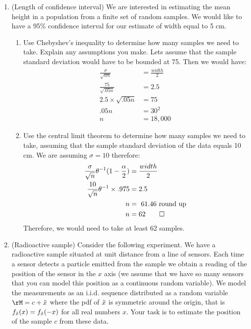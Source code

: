 \documentclass[12pt,twoside]{article}
\newcommand{\rnd}{\Tilde  }
\newcommand{\rx}{\rnd{ x}  }
\begin{document}
\begin{enumerate}
\item (Length of confidence interval) 
We are interested in estimating the mean height in a population from a finite set of random samples. We would like to have a 95\% confidence interval for our estimate of width equal to 5 cm.
\begin{enumerate}
\item Use Chebyshev's inequality to determine how many samples we need to take. Explain any assumptions you make.
\subitem 
Lets assume that the sample standard deviation would have to be bounded at 75.
Then we would have: 
\begin{equation}
    \begin{split}
        \frac{\sigma}{\sqrt{\alpha n}} &= \frac{width}{2} \\
        \frac{75}{\sqrt{.05n}} &= 2.5 \\
        2.5 \times \sqrt{.05n} &= 75 \\
        .05n &= 30^2 \\
        n &= 18,000
    \end{split}
\end{equation}
\item Use the central limit theorem to determine how many samples we need to take, assuming that the sample standard deviation of the data equals 10 cm.
\subitem 
We are assuming $\sigma=10$ therefore:
\begin{equation}
    \begin{split}
        \frac{\sigma}{\sqrt{n}}\theta^{-1}(1-\frac{\alpha}{2}) &= \frac{width}{2}\\
        \frac{10}{\sqrt{n}}\theta^{-1}\times .975 &= 2.5\\
        n &= ~61.46 \text{ round up} \\
        n &= 62 \qed
    \end{split}
\end{equation}
Therefore, we would need to take at least 62 samples. 
\end{enumerate}

\item (Radioactive sample) 
Consider the following experiment. We have a radioactive sample situated at unit distance from a line of sensors. Each time a sensor detects a particle emitted from the sample we obtain a reading of the position of the sensor in the $x$ axis (we assume that we have so many sensors that you can model this position as a continuous random variable). We model the measurements as an i.i.d. sequence distributed as a random variable $\rM=c+\rx$ where the pdf of $\rx$ is symmetric around the origin, that is $f_{\rx}(x)=f_{\rx}(-x)$ for all real numbers $x$. Your task is to estimate the position of the sample $c$ from these data.


\end{enumerate}
\end{document}
